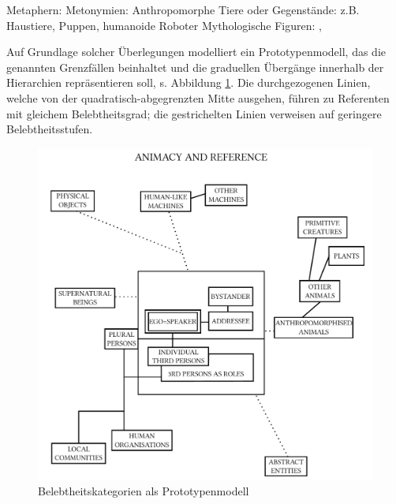 \begin{exe}
	\ex \label{ex:borderlines}
	\begin{xlist}
		\ex \label{ex:metapher} Metaphern: 
 		\ex \label{ex:metonymie} Metonymien: 
		\ex \label{ex:anthropo} Anthropomorphe Tiere oder Gegenstände: z.B. Haustiere, Puppen, humanoide Roboter	
		\ex \label{ex:mytho} Mythologische Figuren: , 
	\end{xlist}
\end{exe}
\noindent
Auf Grundlage solcher Überlegungen modelliert \textcite{Yamamoto1999} ein Prototypenmodell, das die genannten Grenzfällen beinhaltet und die graduellen Übergänge innerhalb der Hierarchien repräsentieren soll, s. Abbildung \ref{yamamoto}. Die durchgezogenen Linien, welche von der quadratisch-abgegrenzten Mitte ausgehen, führen zu Referenten mit gleichem Belebtheitsgrad; die gestrichelten Linien verweisen auf geringere Belebtheitsstufen.

\begin{figure}[p]
\includegraphics[width=\textwidth]{images/yamamoto2.pdf}
\caption {Belebtheitskategorien als Prototypenmodell \parencite[][38]{Yamamoto1999}\label{yamamoto}}
\end{figure} 


